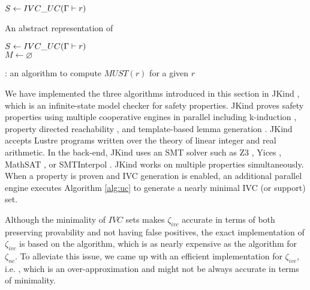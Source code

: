 \begin{algorithm}
  \BlankLine
  $S \leftarrow {IVC\_UC}(\Gamma \vdash r)$ \\
   {
  }
\caption{An abstract representation of \ucbfalg \cite{Ghass16}}
\label{alg:ucbf}
\end{algorithm}


\begin{algorithm}
  \BlankLine
  $S \leftarrow {IVC\_UC}(\Gamma \vdash r)$ \\
  $M \leftarrow \varnothing$ \\
   {
  }
\caption{\mustalg: an algorithm to compute $MUST(r)$ for a given $r$}
\label{alg:must}
\end{algorithm}

We have implemented the three algorithms introduced in this section in JKind \cite{jkind}, which is an infinite-state model checker for safety properties. JKind proves safety properties using multiple cooperative engines in parallel including k-induction \cite{SheeranSS00}, property directed reachability \cite{Een2011:PDR}, and template-based lemma generation \cite{Kahsai2011}. JKind accepts
Lustre programs written over the theory of linear integer and real
arithmetic. In the back-end, JKind uses an SMT solver such as
Z3 \cite{DeMoura08:z3}, Yices \cite{Dutertre06:yices},
MathSAT \cite{Cimatti2013:MathSAT}, or SMTInterpol \cite{Christ2012:SMTInterpol}.
JKind works on multiple properties simultaneously. When a
property is proven and IVC generation is enabled, an additional
parallel engine executes Algorithm \ref{alg:uc} to generate a nearly minimal
IVC (or support) set.

Although the minimality of $IVC$ sets makes $\zeta_{ivc}$ accurate
in terms of both preserving provability and not having false positives, the exact implementation of $\zeta_{ivc}$ is based on the \ucbfalg algorithm, which is as nearly expensive as the \mustalg algorithm for $\zeta_{nc}$. To alleviate this issue, we came up with an efficient implementation for $\zeta_{ivc}$, i.e. \ucalg \cite{Ghass16},
 which is an over-approximation and might not be always accurate in terms of minimality.

